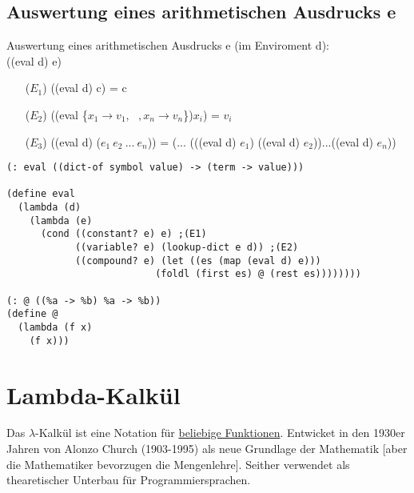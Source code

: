 \documentclass[a4paper,12pt]{article}
\begin{document}
\subsection{Auswertung eines arithmetischen Ausdrucks e}
Auswertung eines arithmetischen Ausdrucks e (im Enviroment d):\\
 ((eval d) e)
\begin{itemize}
\item[($E_1$)] ((eval d) c) = c %
\item[($E_2$)] ((eval \{$x_1\rightarrow v_1, \ \ \ ,x_n \rightarrow v_n$\})$x_i$) = $v_i$ %
\item[($E_3$)] ((eval d) ($e_1 \ e_2 \ ... \ e_n$)) = (... (((eval d) $e_1$) ((eval d) $e_2$))...((eval d) $e_n$))
\end{itemize}
\begin{lstlisting}[style=customc]
(: eval ((dict-of symbol value) -> (term -> value)))

(define eval
  (lambda (d)
    (lambda (e)
      (cond ((constant? e) e) ;(E1)
            ((variable? e) (lookup-dict e d)) ;(E2)
            ((compound? e) (let ((es (map (eval d) e)))
                          (foldl (first es) @ (rest es))))))))
      
(: @ ((%a -> %b) %a -> %b))                   
(define @
  (lambda (f x)
    (f x)))
\end{lstlisting}
\section{Lambda-Kalkül}
Das $\lambda$-Kalkül ist eine Notation für \uline{beliebige Funktionen}. Entwicket in den  1930er Jahren von Alonzo Church (1903-1995) als neue Grundlage der Mathematik [aber die Mathematiker bevorzugen die Mengenlehre]. Seither verwendet als thearetischer Unterbau für Programmiersprachen.
\end{document}

